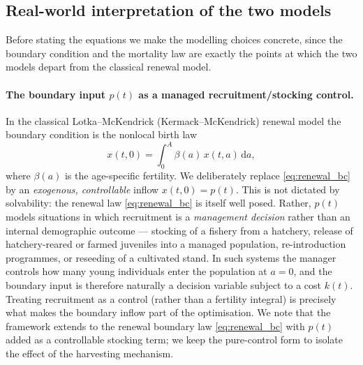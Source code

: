 \documentclass[pdflatex,sn-mathphys-num]{sn-jnl}
\theoremstyle{definition}
\theoremstyle{remark}
\newcommand{\dd}{\,\mathrm{d}}
\begin{document}
\subsection{Real-world interpretation of the two models}
\label{subsec:interpretation}

Before stating the equations we make the modelling choices concrete, since
the boundary condition and the mortality law are exactly the points at which
the two models depart from the classical renewal model.

\paragraph{The boundary input $p(t)$ as a managed recruitment/stocking
control.}
In the classical Lotka--McKendrick (Kermack--McKendrick) renewal model the
boundary condition is the nonlocal birth law
\begin{equation}\label{eq:renewal_bc}
x(t,0)=\int_0^A \beta(a)\,x(t,a)\dd a,
\end{equation}
where $\beta(a)$ is the age-specific fertility. We deliberately replace
\eqref{eq:renewal_bc} by an \emph{exogenous, controllable} inflow
$x(t,0)=p(t)$. This is not dictated by solvability: the renewal law
\eqref{eq:renewal_bc} is itself well posed. Rather, $p(t)$ models situations
in which recruitment is a \emph{management decision} rather than an internal
demographic outcome --- stocking of a fishery from a hatchery, release of
hatchery-reared or farmed juveniles into a managed population,
re-introduction programmes, or reseeding of a cultivated stand. In such
systems the manager controls how many young individuals enter the population
at $a=0$, and the boundary input is therefore naturally a decision variable
subject to a cost $k(t)$. Treating recruitment as a control (rather than a
fertility integral) is precisely what makes the boundary inflow part of the
optimisation. We note that the framework extends to the renewal boundary law
\eqref{eq:renewal_bc} with $p(t)$ added as a controllable stocking term; we
keep the pure-control form to isolate the effect of the harvesting mechanism.
\end{document}
